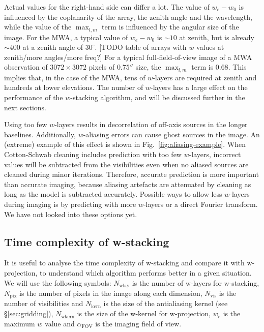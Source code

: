 \documentclass[useAMS,usenatbib]{mn2e}
\begin{document}
Actual values for the right-hand side can differ a lot. The value of $w_e - w_0$ is influenced by the coplanarity of the array, the zenith angle and the wavelength, while the value of the $\max_{l,m}$ term is influenced by the angular size of the image. For the MWA, a typical value of $w_e - w_0$ is $\sim 10$ at zenith, but is already $\sim 400$ at a zenith angle of $30^{\circ}$. [TODO table of arrays with $w$ values at zenith/more angles/more freq?] For a typical full-field-of-view image of a MWA observation of $3072\times 3072$ pixels of $0.75''$ size, the $\max_{l,m}$ term is $0.68$. This implies that, in the case of the MWA, tens of $w$-layers are required at zenith and hundreds at lower elevations. The number of $w$-layers has a large effect on the performance of the $w$-stacking algorithm, and will be discussed further in the next sections.

Using too few $w$-layers results in decorrelation of off-axis sources in the longer baselines. Additionally, $w$-aliasing errors can cause ghost sources in the image. An (extreme) example of this effect is shown in Fig.~\ref{fig:aliasing-example}. When Cotton-Schwab cleaning includes prediction with too few $w$-layers, incorrect values will be subtracted from the visibilities even when no aliased sources are cleaned during minor iterations. Therefore, accurate prediction is more important than accurate imaging, because aliasing artefacts are attenuated by cleaning as long as the model is subtracted accurately. Possible ways to allow less $w$-layers during imaging is by predicting with more $w$-layers or a direct Fourier transform. We have not looked into these options yet.

\subsection{Time complexity of w-stacking} \label{sec:time-complexity}
It is useful to analyse the time complexity of w-stacking and compare it with w-projection, to understand which algorithm performs better in a given situation. We will use the following symbols: $N_\textrm{wlay}$ is the number of w-layers for w-stacking, $N_\textrm{pix}$ is the number of pixels in the image along each dimension, $N_\textrm{vis}$ is the number of visibilities and $N_\textrm{kern}$ is the size of the antialiasing kernel (see \S\ref{sec:gridding}), $N_\textrm{wkern}$ is the size of the w-kernel for w-projection, $w_e$ is the maximum $w$ value and $\alpha_\textrm{FOV}$ is the imaging field of view.
\end{document}

